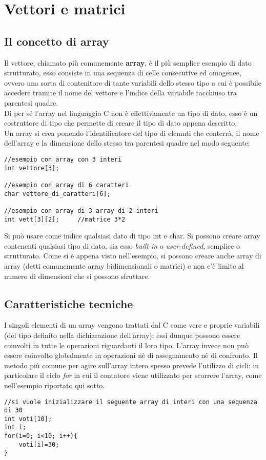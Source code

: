\chapter{Vettori e matrici}
\section{Il concetto di array}
Il vettore, chiamato più comunemente \textbf{array}, è il più semplice esempio di dato strutturato, esso consiste in una sequenza di celle consecutive ed omogenee, ovvero una sorta di contenitore di tante variabili dello stesso tipo a cui è possibile accedere tramite il nome del vettore e l’indice della variabile racchiuso tra parentesi quadre.\\
Di per sé l'array nel linguaggio C non è effettivamente un tipo di dato, esso è un costruttore di tipo che permette di creare il tipo di dato appena descritto. \\
Un array si crea ponendo l'identificatore del tipo di elemnti che conterrà, il nome dell'array e la dimensione dello stesso tra parentesi quadre nel modo seguente:
\begin{lstlisting}[title={Implementazione di un array}]
//esempio con array con 3 interi
int vettore[3];

//esempio con array di 6 caratteri
char vettore_di_caratteri[6];

//esempio con array di 3 array di 2 interi
int vett[3][2];		//matrice 3*2
\end{lstlisting}
Si può usare come indice qualsiasi dato di tipo int e char.
Si possono creare array contenenti qualsiasi tipo di dato, sia esso \textit{built-in} o \textit{user-defined}, semplice o strutturato. Come si è appena visto nell'esempio, si possono creare anche array di array (detti comunemente array bidimensionali o matrici) e non c'è limite al numero di dimensioni che si possono sfruttare.

\section{Caratteristiche tecniche}
I singoli elementi di un array vengono trattati dal C come vere e proprie variabili (del tipo definito nella dichiarazione dell'array): essi dunque possono essere coinvolti in tutte le operazioni riguardanti il loro tipo. L'array invece non può essere coinvolto globalmente in operazioni nè di assegnamento nè di confronto. Il metodo più comune per agire sull'array intero spesso prevede l'utilizzo di cicli: in particolare il ciclo \textit{for} in cui il contatore viene utilizzato per scorrere l'array, come nell'esempio riportato qui sotto.
\begin{lstlisting}[title={Implementazione di un array}]
//si vuole inizializzare il seguente array di interi con una sequenza di 30
int voti[10];
int i;
for(i=0; i<10; i++){
    voti[i]=30;
}
\end{lstlisting}

